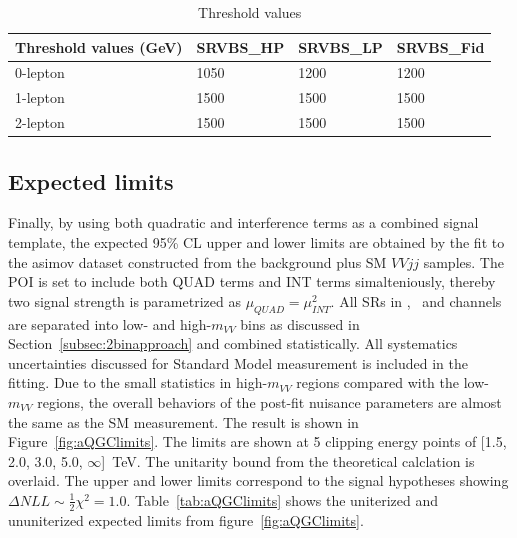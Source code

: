 \begin{table}[ht!]
\small
\begin{center}
\begin{tabular}{ | l || l | l | l |}
\hline
Threshold values (GeV)          & SRVBS\_HP  & SRVBS\_LP & SRVBS\_Fid  \tabularnewline \hline
0-lepton & 1050      & 1200     & 1200       \tabularnewline \hline
1-lepton & 1500      & 1500     & 1500       \tabularnewline \hline
2-lepton & 1500      & 1500     & 1500       \tabularnewline \hline
\end{tabular}
\caption{Threshold values}
\label{tab:2binthreshold}
\end{center}
\end{table}



\subsection{Expected limits}

Finally, by using both quadratic and interference terms as a combined signal template,
the expected 95\% CL upper and lower limits are obtained by the fit to the asimov dataset constructed
from the background plus SM $VVjj$ samples.
The POI is set to include both QUAD terms and INT terms simalteniously, thereby two signal strength is parametrized as $\mu_{QUAD} = \mu_{INT}^2$.
All SRs in \zlep, \olep\ and \tlep channels are separated into low- and high-$m_{VV}$ bins as discussed in Section~\ref{subsec:2binapproach}
and combined statistically.
All systematics uncertainties discussed for Standard Model measurement is included in the fitting.
Due to the small statistics in high-$m_{VV}$ regions compared with the low-$m_{VV}$ regions,
the overall behaviors of the post-fit nuisance parameters are almost the same as the SM measurement.
The result is shown in Figure~\ref{fig:aQGClimits}.
The limits are shown at 5 clipping energy points of [1.5, 2.0, 3.0, 5.0, $\infty$]~TeV.
The unitarity bound from the theoretical calclation \cite{PhysRevD.101.113003} is overlaid.
The upper and lower limits correspond to the signal hypotheses showing $\Delta NLL \sim \frac{1}{2}\chi^2 = 1.0$.
Table~\ref{tab:aQGClimits} shows the uniterized and ununiterized expected limits from figure~\ref{fig:aQGClimits}.

